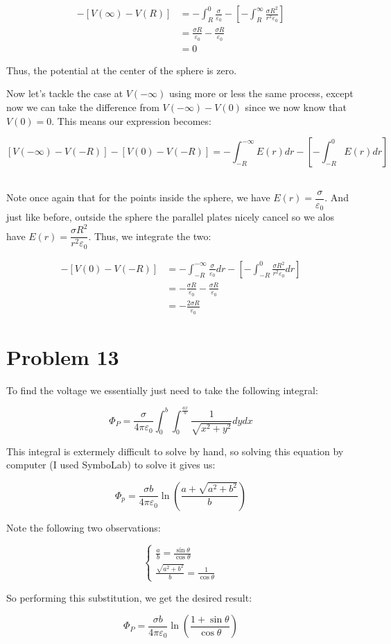 \documentclass{article}
\theoremstyle{definition}
\numberwithin{equation}{section}
\numberwithin{definition}{section}
\begin{document}
    \begin{align*}
        [V(0) - V(R)] - [V(\infty) - V(R)] &= -\int_R^0 \frac{\sigma}{\varepsilon_0} - \left[ -\int_R^\infty \frac{\sigma R^2}{r^2 \varepsilon_0}\right]\\
        &= \frac{\sigma R}{\varepsilon_0} - \frac{\sigma R}{\varepsilon_0}\\
        &= 0 
    \end{align*}

    Thus, the potential at the center of the sphere is zero.

    \medskip

    Now let's tackle the case at $V(-\infty)$ using more or less the same process, except now we can take the difference from $V(-\infty) - V(0)$ since we now know that $V(0) = 0$. This means our expression becomes:

    \[ [V(-\infty) - V(-R)] - [V(0) - V(-R)] = -\int_{-R}^{-\infty} E(r) dr - \left[-\int_{-R}^0 E(r) dr\right]\]\
    
    Note once again that for the points inside the sphere, we have $E(r) = \dfrac{\sigma}{\varepsilon_0}$. And just like before, outside the sphere the parallel plates nicely cancel so we alos have $E(r) = \dfrac{\sigma R^2}{r^2 \varepsilon_0}$. Thus, we integrate the two:

    \begin{align*}
        [V(-\infty) - V(-R)] - [V(0) - V(-R)] &= -\int_{-R}^{-\infty} \frac{\sigma}{\varepsilon_0} dr - \left[-\int_{-R}^0 \frac{\sigma R^2}{r^2\varepsilon_0} dr\right]\\
        &= -\frac{\sigma R}{\varepsilon_0} - \frac{\sigma R}{\varepsilon_0}\\
        &= -\frac{2\sigma R}{\varepsilon_0}
    \end{align*}

    \section{Problem 13}
    
    To find the voltage we essentially just need to take the following integral:

    \[\Phi_P = \frac{\sigma}{4\pi \varepsilon_0}\int_0^b \int_0^{\frac{ax}{b}} \frac{1}{\sqrt{x^2 + y^2}} dy dx \]

    This integral is extermely difficult to solve by hand, so solving this equation by computer (I used SymboLab) to solve it gives us:

    \[ \Phi_p = \frac{\sigma b}{4\pi \varepsilon_0} \ln \left(\frac{a + \sqrt{a^2 + b^2}}{b}\right)\]

    Note the following two observations:
    
   \[ \begin{cases}  
    \frac{a}{b} = \frac{\sin\theta}{\cos\theta} \\
    \frac{\sqrt{a^2 + b^2}}{b}= \frac{1}{\cos\theta}
    \end{cases}
    \]

    So performing this substitution, we get the desired result: 
    
    \[ \Phi_P = \frac{\sigma b}{4\pi\varepsilon_0}\ln\left(\frac{1 + \sin \theta}{\cos\theta}\right)\]

    
\end{document}
